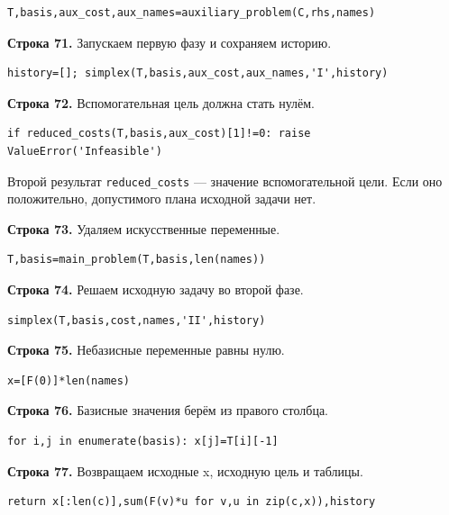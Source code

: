 \documentclass[12pt,a4paper]{article}
\begin{document}
\begin{Verbatim}[fontsize=\small,breaklines=true,breakanywhere=true]
    T,basis,aux_cost,aux_names=auxiliary_problem(C,rhs,names)
\end{Verbatim}
\par\textbf{Строка 71.} Запускаем первую фазу и сохраняем историю.
\begin{Verbatim}[fontsize=\small,breaklines=true,breakanywhere=true]
    history=[]; simplex(T,basis,aux_cost,aux_names,'I',history)
\end{Verbatim}
\par\textbf{Строка 72.} Вспомогательная цель должна стать нулём.
\begin{Verbatim}[fontsize=\small,breaklines=true,breakanywhere=true]
    if reduced_costs(T,basis,aux_cost)[1]!=0: raise ValueError('Infeasible')
\end{Verbatim}
Второй результат \texttt{reduced\_costs} --- значение вспомогательной цели. Если оно положительно, допустимого плана исходной задачи нет.
\par\textbf{Строка 73.} Удаляем искусственные переменные.
\begin{Verbatim}[fontsize=\small,breaklines=true,breakanywhere=true]
    T,basis=main_problem(T,basis,len(names))
\end{Verbatim}
\par\textbf{Строка 74.} Решаем исходную задачу во второй фазе.
\begin{Verbatim}[fontsize=\small,breaklines=true,breakanywhere=true]
    simplex(T,basis,cost,names,'II',history)
\end{Verbatim}
\par\textbf{Строка 75.} Небазисные переменные равны нулю.
\begin{Verbatim}[fontsize=\small,breaklines=true,breakanywhere=true]
    x=[F(0)]*len(names)
\end{Verbatim}
\par\textbf{Строка 76.} Базисные значения берём из правого столбца.
\begin{Verbatim}[fontsize=\small,breaklines=true,breakanywhere=true]
    for i,j in enumerate(basis): x[j]=T[i][-1]
\end{Verbatim}
\par\textbf{Строка 77.} Возвращаем исходные x, исходную цель и таблицы.
\begin{Verbatim}[fontsize=\small,breaklines=true,breakanywhere=true]
    return x[:len(c)],sum(F(v)*u for v,u in zip(c,x)),history
\end{Verbatim}
\end{document}
